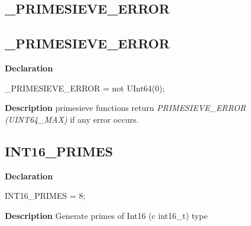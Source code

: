 \documentclass{report}
\newif\ifpdf
\begin{document}
\subsection*{\large{\textbf{{\_}PRIMESIEVE{\_}ERROR}}\normalsize\hspace{1ex}\hrulefill}
\else
\subsection*{{\_}PRIMESIEVE{\_}ERROR}
\fi
\label{primesieve-_PRIMESIEVE_ERROR}
\begin{list}{}{
\setlength{\itemindent}{0cm}
\setlength{\listparindent}{0cm}
\setlength{\leftmargin}{\evensidemargin}
\addtolength{\leftmargin}{\tmplength}
\settowidth{\labelsep}{X}
\addtolength{\leftmargin}{\labelsep}
\setlength{\labelwidth}{\tmplength}
}
\item[\textbf{Declaration}\hfill]
\ifpdf
\begin{flushleft}
\fi
\begin{ttfamily}
{\_}PRIMESIEVE{\_}ERROR = not UInt64(0);\end{ttfamily}

\ifpdf
\end{flushleft}
\fi

\par
\item[\textbf{Description}]
primesieve functions return \textit{PRIMESIEVE{\_}ERROR (UINT64{\_}MAX)} if any error occurs.

\end{list}
\ifpdf
\subsection*{\large{\textbf{INT16{\_}PRIMES}}\normalsize\hspace{1ex}\hrulefill}
\else
\subsection*{INT16{\_}PRIMES}
\fi
\label{primesieve-INT16_PRIMES}
\begin{list}{}{
\setlength{\itemindent}{0cm}
\setlength{\listparindent}{0cm}
\setlength{\leftmargin}{\evensidemargin}
\addtolength{\leftmargin}{\tmplength}
\settowidth{\labelsep}{X}
\addtolength{\leftmargin}{\labelsep}
\setlength{\labelwidth}{\tmplength}
}
\item[\textbf{Declaration}\hfill]
\ifpdf
\begin{flushleft}
\fi
\begin{ttfamily}
INT16{\_}PRIMES = 8;\end{ttfamily}

\ifpdf
\end{flushleft}
\fi

\par
\item[\textbf{Description}]
Generate primes of Int16 (c int16{\_}t) type

\end{list}
\ifpdf
\end{document}
